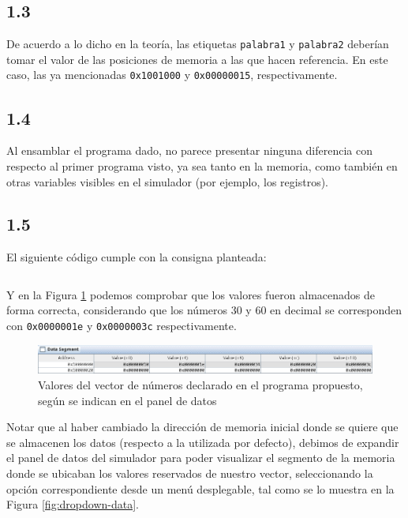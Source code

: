 \documentclass[a4paper]{report}
\begin{document}
\subsection*{1.3}

De acuerdo a lo dicho en la teoría, las etiquetas \texttt{palabra1} y \texttt{palabra2} deberían tomar el valor de las posiciones de memoria a las que hacen referencia. En este caso, las ya mencionadas \texttt{0x1001000} y \texttt{0x00000015}, respectivamente.

\subsection*{1.4}

Al ensamblar el programa dado, no parece presentar ninguna diferencia con respecto al primer programa visto, ya sea tanto en la memoria, como también en otras variables visibles en el simulador (por ejemplo, los registros).

\subsection*{1.5}

El siguiente código cumple con la consigna planteada:

\vspace{7pt}
\inputminted[linenos]{gas}{src/cuestiones/c1-5.asm}
\vspace{7pt}

Y en la Figura \ref{fig:arr5-mem} podemos comprobar que los valores fueron almacenados de forma correcta, considerando que los números 30 y 60 en decimal se corresponden con \texttt{0x0000001e} y \texttt{0x0000003c} respectivamente.

\begin{figure}[h]
    \centering
    \captionsetup{justification = centering}
    \includegraphics[width=.95\linewidth]{img/c1-5a}
    \caption{Valores del vector de números declarado en el programa propuesto, según se indican en el panel de datos}
    \label{fig:arr5-mem}
\end{figure}

Notar que al haber cambiado la dirección de memoria inicial donde se quiere que se almacenen los datos (respecto a la utilizada por defecto), debimos de expandir el panel de datos del simulador para poder visualizar el segmento de la memoria donde se ubicaban los valores reservados de nuestro vector, seleccionando la opción correspondiente desde un menú desplegable, tal como se lo muestra en la Figura \ref{fig:dropdown-data}.
\end{document}
